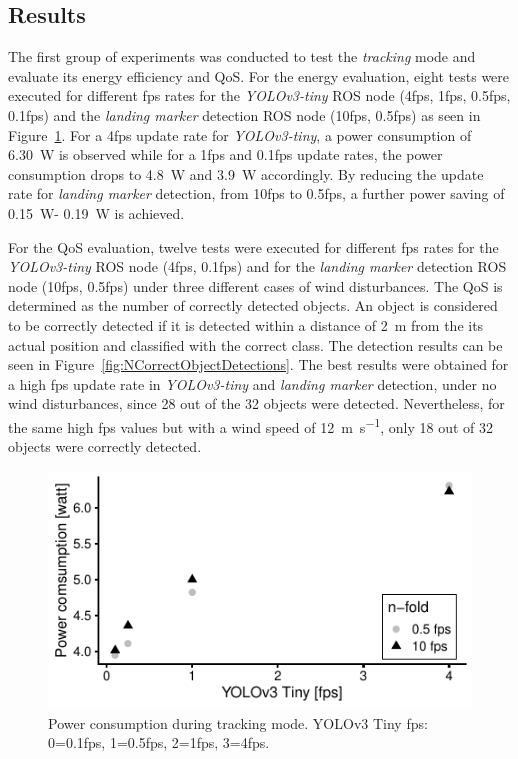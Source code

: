 \documentclass[conference, onecolumn, draftclsnofoot]{IEEEtran}
\begin{document}
\subsection{Results}

The first group of experiments was conducted to test the \emph{tracking} mode and evaluate its 
energy efficiency and QoS. For the energy 
evaluation, eight tests were executed for different fps rates 
for the \emph{YOLOv3-tiny} ROS node (4fps, 1fps, 0.5fps, 0.1fps) and 
the \emph{landing marker} detection ROS node (10fps, 0.5fps) as 
%
seen in Figure~\ref{fig:PowerDuringTracking}. For a 4fps update rate
for \emph{YOLOv3-tiny}, a power consumption of \SI{6.30}{\watt} is observed while
for a 1fps and 0.1fps update rates, the power consumption drops to
\SI{4,8}{\watt} and \SI{3.9}{\watt} accordingly. By reducing the update rate for
\emph{landing marker} detection, from 10fps to 0.5fps, a further power
saving of \SI{0.15}{\watt}- \SI{0.19}{\watt} is achieved.



For the QoS evaluation, twelve tests were executed for different 
fps rates for the \emph{YOLOv3-tiny} ROS node (4fps, 0.1fps) and for 
the \emph{landing marker} detection ROS node (10fps, 0.5fps) under 
three different cases of wind disturbances. 
%
The QoS is determined as the number of correctly detected objects. An
object is considered to be correctly detected if it is detected within
a distance of \SI{2}{\meter} from the its actual position and classified with
the correct class. The detection results can be seen in
Figure~\ref{fig:NCorrectObjectDetections}. The best results were
obtained for a high fps update rate in \emph{YOLOv3-tiny} and \emph{landing marker} 
detection, under no wind disturbances, since 28 out of the 32
objects were detected. Nevertheless, for the same high fps values but
with a wind speed of \SI{12}{\meter \per \second}, only 18 out of 32 objects were
correctly detected.



\begin{figure}[t]
\centering
\includegraphics{data_visualization/PowerDetection.pdf}
\caption{Power consumption during tracking mode. YOLOv3 Tiny fps:
  0=0.1fps, 1=0.5fps, 2=1fps, 3=4fps.}
\label{fig:PowerDuringTracking}
\end{figure}
\end{document}
